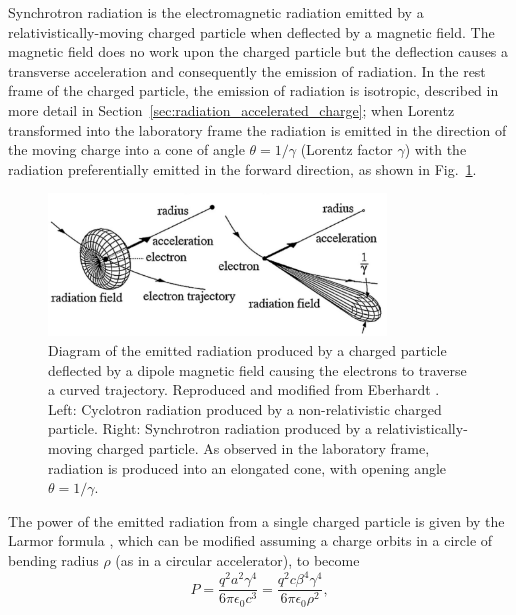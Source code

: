 \documentclass[../main.tex]{subfiles}
\begin{document}
Synchrotron radiation is the electromagnetic radiation emitted by a relativistically-moving charged particle when deflected by a magnetic field. The magnetic field does no work upon the charged particle but the deflection causes a transverse acceleration and consequently the emission of radiation. In the rest frame of the charged particle, the emission of radiation is isotropic, described in more detail in Section~\ref{sec:radiation_accelerated_charge}; when Lorentz transformed into the laboratory frame the radiation is emitted in the direction of the moving charge into a cone of angle $\theta = 1/\gamma$ (Lorentz factor $\gamma$) with the radiation preferentially emitted in the forward direction, as shown in Fig.~\ref{fig:synchrotron_radiation_diagram}.
\begin{figure}[!h]
\centering
\includegraphics[width=0.8\textwidth]{Figures/Introduction/Synchrotron_Radiation_Diagram.pdf}
\caption{Diagram of the emitted radiation produced by a charged particle deflected by a dipole magnetic field causing the electrons to traverse a curved trajectory. Reproduced and modified from Eberhardt \cite{eberhardt2015synchrotron}. Left: Cyclotron radiation produced by a non-relativistic charged particle. Right: Synchrotron radiation produced by a relativistically-moving charged particle. As observed in the laboratory frame, radiation is produced into an elongated cone, with opening angle $\theta = 1/\gamma$.}
\label{fig:synchrotron_radiation_diagram}
\end{figure}
The power of the emitted radiation from a single charged particle is given by the Larmor formula \cite{larmor1897lxiii}, which can be modified assuming a charge orbits in a circle of bending radius $\rho$ (as in a circular accelerator), to become
\begin{equation}
P = \frac{q^{2}a^{2}\gamma^{4}}{6\pi\epsilon_{0}c^{3}} = \frac{q^{2}c\beta^{4}\gamma^{4}}{6\pi\epsilon_{0}\rho^{2}},
\label{eq:synchrotron_radiation_power}    
\end{equation}
\end{document}
